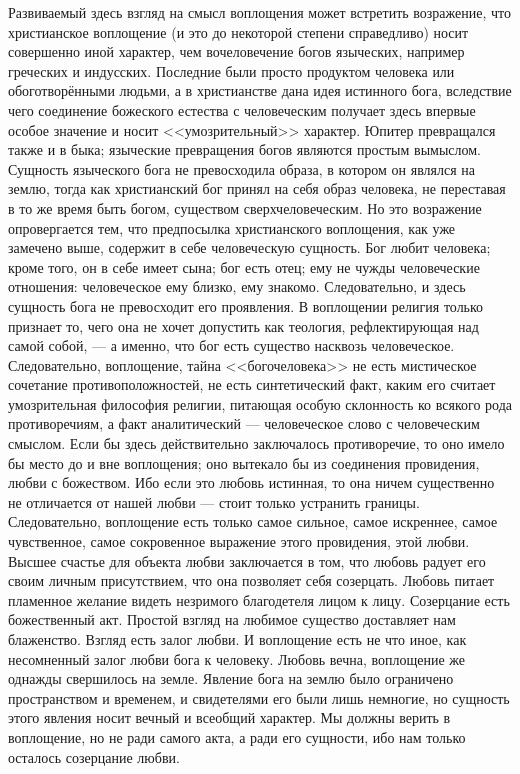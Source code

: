 \documentclass[12pt,oneside]{book}
\begin{document}
Развиваемый здесь взгляд на смысл воплощения может встретить возражение, что христианское воплощение (и это до некоторой степени справедливо) носит совершенно иной характер, чем вочеловечение богов языческих, например греческих и индусских. Последние были просто продуктом человека или обоготворёнными людьми, а в христианстве дана идея истинного бога, вследствие чего соединение божеского естества с человеческим получает здесь впервые особое значение и носит <<умозрительный>> характер. Юпитер превращался также и в быка; языческие превращения богов являются простым вымыслом. Сущность языческого бога не превосходила образа, в котором он являлся на землю, тогда как христианский бог принял на себя образ человека, не переставая в то же время быть богом, существом сверхчеловеческим. Но это возражение опровергается тем, что предпосылка христианского воплощения, как уже замечено выше, содержит в себе человеческую сущность. Бог любит человека; кроме того, он в себе имеет сына; бог есть отец; ему не чужды человеческие отношения: человеческое ему близко, ему знакомо. Следовательно, и здесь сущность бога не превосходит его проявления. В воплощении религия только признает то, чего она не хочет допустить как теология, рефлектирующая над самой собой, --- а именно, что бог есть существо насквозь человеческое. Следовательно, воплощение, тайна <<богочеловека>> не есть мистическое сочетание противоположностей, не есть синтетический факт, каким его считает умозрительная философия религии, питающая особую склонность ко всякого рода противоречиям, а факт аналитический --- человеческое слово с человеческим смыслом. Если бы здесь действительно заключалось противоречие, то оно имело бы место до и вне воплощения; оно вытекало бы из соединения провидения, любви с божеством. Ибо если это любовь истинная, то она ничем существенно не отличается от нашей любви --- стоит только устранить границы. Следовательно, воплощение есть только самое сильное, самое искреннее, самое чувственное, самое сокровенное выражение этого провидения, этой любви. Высшее счастье для объекта любви заключается в том, что любовь радует его своим личным присутствием, что она позволяет себя созерцать. Любовь питает пламенное желание видеть незримого благодетеля лицом к лицу. Созерцание есть божественный акт. Простой взгляд на любимое существо доставляет нам блаженство. Взгляд есть залог любви. И воплощение есть не что иное, как несомненный залог любви бога к человеку. Любовь вечна, воплощение же однажды свершилось на земле. Явление бога на землю было ограничено пространством и временем, и свидетелями его были лишь немногие, но сущность этого явления носит вечный и всеобщий характер. Мы должны верить в воплощение, но не ради самого акта, а ради его сущности, ибо нам только осталось созерцание любви.
\end{document}
